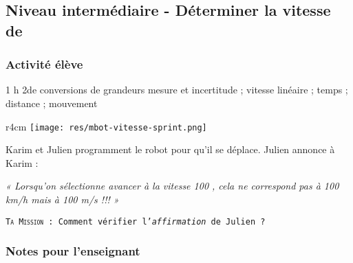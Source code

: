 \newpage
\subsection{Niveau intermédiaire - Déterminer la vitesse de \mbot}

\subsubsection{Activité élève}

\cartouche
{1 h}         %
{2de}           %
{conversions de grandeurs}        %
{mesure et incertitude ;  vitesse linéaire ; temps ; distance ; mouvement}     %
{}       %


\begin{wrapfigure}[4]{r}{4cm}
    \texttt{[image: res/mbot-vitesse-sprint.png]}
\end{wrapfigure}

\begin{eleve}    

Karim et Julien programment le robot \mbot pour qu’il se déplace. Julien annonce à Karim :

\vspace{1em}

\begin{minipage}{0.65\linewidth}
    \emph{« Lorsqu’on sélectionne avancer à la vitesse 100 , cela ne correspond pas à 100 km/h mais à 100 m/s !!! »}
\end{minipage}

\vspace{1em}

\texttt{\Large\textsc{Ta Mission} : Comment vérifier l’\emph{affirmation} de Julien ?}
    
\end{eleve}



\subsubsection{Notes pour l'enseignant}

%
%


